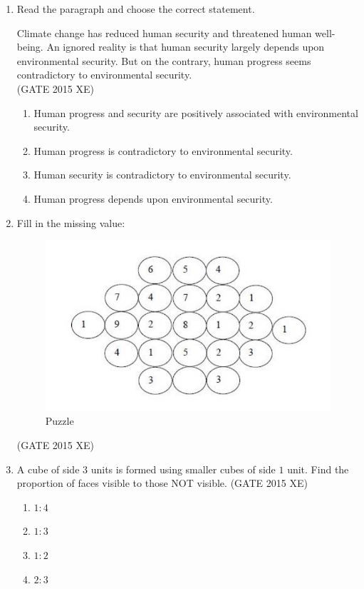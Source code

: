 \documentclass[journal,12pt,onecolumn]{IEEEtran}
\begin{document}
\begin{enumerate}
\newpage

\item Read the paragraph and choose the correct statement.  

Climate change has reduced human security and threatened human well-being. An ignored reality is that human security largely depends upon environmental security. But on the contrary, human progress seems contradictory to environmental security.  \\
\hfill{(GATE 2015 XE)} \\

\begin{multicols}{2}
\begin{enumerate}
\item Human progress and security are positively associated with environmental security.
\item Human progress is contradictory to environmental security.
\item Human security is contradictory to environmental security.
\item Human progress depends upon environmental security.
\end{enumerate}
\end{multicols}


\item Fill in the missing value:
\begin{figure}[htbp]
  \centering
  \includegraphics[width=.6\columnwidth]{figs/GA/fig1.png}
  \caption{Puzzle}
  \label{fig:figs/GA/fig1}
\end{figure}

\hfill{(GATE 2015 XE)} \\


\item A cube of side $3$ units is formed using smaller cubes of side $1$ unit. Find the proportion of faces visible to those NOT visible.
\hfill{(GATE 2015 XE)} 
\begin{multicols}{4}
\begin{enumerate}
\item $1:4$
\item $1:3$
\item $1:2$
\item $2:3$
\end{enumerate}
\end{multicols}


\end{enumerate}
\end{document}
